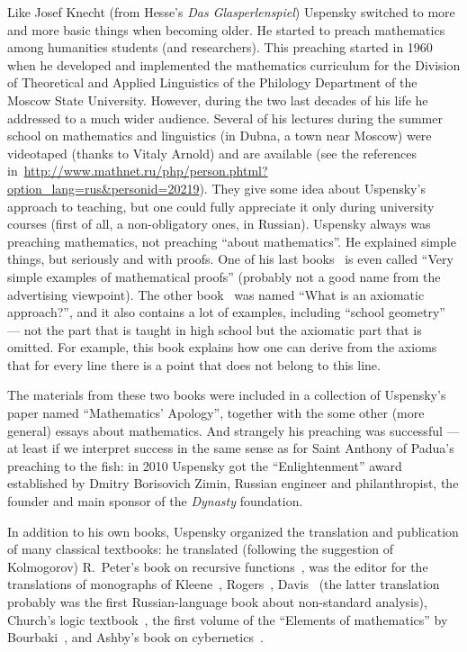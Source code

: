 \documentclass[12pt]{article}
\theoremstyle{remark}
\begin{document}
Like Josef Knecht (from Hesse's \emph{Das Glasperlenspiel}) Uspensky switched to more and more basic things when becoming older. He started to preach mathematics among humanities students (and researchers). This preaching started in 1960 when he developed and implemented the mathematics curriculum for the Division of Theoretical and Applied Linguistics of the Philology Department of the Moscow State University. However, during the two last decades of his life he addressed to a much wider audience. Several of his lectures during the summer school on mathematics and linguistics (in Dubna, a town near Moscow) were videotaped (thanks to Vitaly Arnold) and are available (see the references in~\url{http://www.mathnet.ru/php/person.phtml?option_lang=rus&personid=20219}). They give some idea about Uspensky's approach to teaching, but one could fully appreciate it only during university courses (first of all, a non-obligatory ones,  in Russian). Uspensky always was preaching mathematics, not preaching ``about mathematics''. He explained simple things, but seriously and with proofs. One of his last books~\cite{2009b} is even called ``Very simple examples of mathematical proofs'' (probably not a good name from the advertising viewpoint). The other book~\cite{2000} 	was named ``What is an axiomatic approach?'', and it also contains a lot of examples, including ``school geometry'' --- not the part that is taught in high school but the axiomatic part that is omitted. For example, this book explains how one can derive from the axioms that for every line there is a point that does not belong to this line.

The materials from these two books were included in a collection of Uspensky's paper named ``Mathematics' Apology''\cite{2009}, together with the some other (more general) essays about mathematics. And strangely his preaching was successful --- at least if we interpret success in the same sense as for Saint Anthony of Padua's preaching to the fish: in 2010 Uspensky got the ``Enlightenment'' award established by Dmitry Borisovich Zimin, Russian engineer and philanthropist, the founder and main sponsor of the \emph{Dynasty} foundation.

In addition to his own books, Uspensky organized the translation and publication of many classical textbooks: he translated (following the suggestion of Kolmogorov) R.~Peter's book on recursive functions~\cite{Peter1954}, was the editor for the translations of monographs of Kleene~\cite{Kleene1957}, Rogers~\cite{Rogers1972}, Davis~\cite{DavisNonStandard1980} (the latter translation probably was the first Russian-language book about non-standard analysis), Church's logic textbook~\cite{Church1960}, the first volume of the ``Elements of mathematics'' by Bourbaki~\cite{BourbakiSetTheory1965}, and Ashby's book on cybernetics~\cite{Ashby1959}. 
\end{document}
